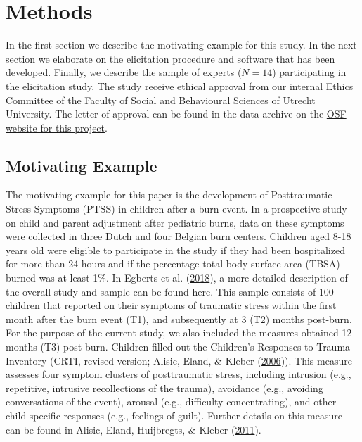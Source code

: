 \documentclass[openright,titlepage,12pt,a4paper]{book}
\begin{document}
\hypertarget{methods}{%
\section{Methods}\label{methods}}

In the first section we describe the motivating example for this study. In the next section we elaborate on the elicitation procedure and software that has been developed. Finally, we describe the sample of experts (\(N=14\)) participating in the elicitation study. The study receive ethical approval from our internal Ethics Committee of the Faculty of Social and Behavioural Sciences of Utrecht University. The letter of approval can be found in the data archive on the \href{https://osf.io/y5evf/}{OSF website for this project}.

\hypertarget{motivating-example}{%
\subsection{Motivating Example}\label{motivating-example}}

The motivating example for this paper is the development of Posttraumatic Stress Symptoms (PTSS) in children after a burn event. In a prospective study on child and parent adjustment after pediatric burns, data on these symptoms were collected in three Dutch and four Belgian burn centers. Children aged 8-18 years old were eligible to participate in the study if they had been hospitalized for more than 24 hours and if the percentage total body surface area (TBSA) burned was at least 1\%. In Egberts et al. (\protect\hyperlink{ref-egberts_mother_2018}{2018}), a more detailed description of the overall study and sample can be found here. This sample consists of 100 children that reported on their symptoms of traumatic stress within the first month after the burn event (T1), and subsequently at 3 (T2) months post-burn. For the purpose of the current study, we also included the measures obtained 12 months (T3) post-burn. Children filled out the Children's Responses to Trauma Inventory (CRTI, revised version; Alisic, Eland, \& Kleber (\protect\hyperlink{ref-alisic_childrens_2006}{2006})). This measure assesses four symptom clusters of posttraumatic stress, including intrusion (e.g., repetitive, intrusive recollections of the trauma), avoidance (e.g., avoiding conversations of the event), arousal (e.g., difficulty concentrating), and other child-specific responses (e.g., feelings of guilt). Further details on this measure can be found in Alisic, Eland, Huijbregts, \& Kleber (\protect\hyperlink{ref-alisic_manual_2011}{2011}).
\end{document}
